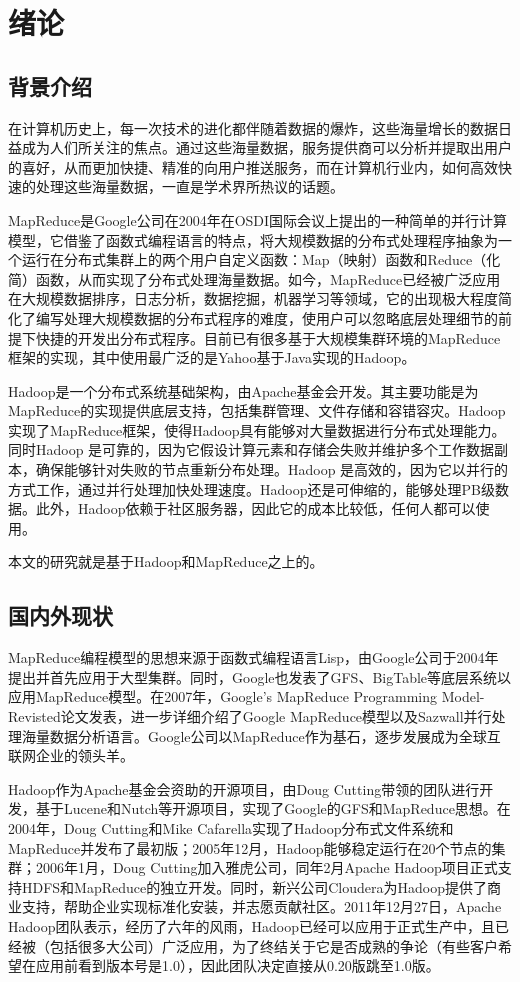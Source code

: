 \chapter{绪论}
\label{chap:1}

\section{背景介绍}

在计算机历史上，每一次技术的进化都伴随着数据的爆炸，这些海量增长的数据日益成为人们所关注的焦点。通过这些海量数据，服务提供商可以分析并提取出用户的喜好，从而更加快捷、精准的向用户推送服务，而在计算机行业内，如何高效快速的处理这些海量数据，一直是学术界所热议的话题。

MapReduce是Google公司在2004年在OSDI国际会议上提出的一种简单的并行计算模型\cite{paper:Google-MapReduce}，它借鉴了函数式编程语言的特点，将大规模数据的分布式处理程序抽象为一个运行在分布式集群上的两个用户自定义函数：Map（映射）函数和Reduce（化简）函数，从而实现了分布式处理海量数据。如今，MapReduce已经被广泛应用在大规模数据排序，日志分析，数据挖掘，机器学习等领域，它的出现极大程度简化了编写处理大规模数据的分布式程序的难度，使用户可以忽略底层处理细节的前提下快捷的开发出分布式程序。目前已有很多基于大规模集群环境的MapReduce框架的实现，其中使用最广泛的是Yahoo基于Java实现的Hadoop。

Hadoop是一个分布式系统基础架构\cite{site:Hadoop}，由Apache基金会开发。其主要功能是为MapReduce的实现提供底层支持，包括集群管理、文件存储和容错容灾。Hadoop 实现了MapReduce框架，使得Hadoop具有能够对大量数据进行分布式处理能力。同时Hadoop 是可靠的，因为它假设计算元素和存储会失败并维护多个工作数据副本，确保能够针对失败的节点重新分布处理。Hadoop 是高效的，因为它以并行的方式工作，通过并行处理加快处理速度。Hadoop还是可伸缩的，能够处理PB级数据。此外，Hadoop依赖于社区服务器，因此它的成本比较低，任何人都可以使用。

本文的研究就是基于Hadoop和MapReduce之上的。

\section{国内外现状}
MapReduce编程模型的思想来源于函数式编程语言Lisp，由Google公司于2004年提出并首先应用于大型集群。同时，Google也发表了GFS、BigTable等底层系统以应用MapReduce模型。在2007年，Google’s MapReduce Programming Model-Revisted论文发表，进一步详细介绍了Google MapReduce模型以及Sazwall并行处理海量数据分析语言。Google公司以MapReduce作为基石，逐步发展成为全球互联网企业的领头羊。

Hadoop作为Apache基金会资助的开源项目，由Doug Cutting带领的团队进行开发，基于Lucene和Nutch等开源项目，实现了Google的GFS和MapReduce思想。在2004年，Doug Cutting和Mike Cafarella实现了Hadoop分布式文件系统和MapReduce并发布了最初版；2005年12月，Hadoop能够稳定运行在20个节点的集群；2006年1月，Doug Cutting加入雅虎公司，同年2月Apache Hadoop项目正式支持HDFS和MapReduce的独立开发。同时，新兴公司Cloudera为Hadoop提供了商业支持，帮助企业实现标准化安装，并志愿贡献社区。2011年12月27日，Apache Hadoop团队表示，经历了六年的风雨，Hadoop已经可以应用于正式生产中，且已经被（包括很多大公司）广泛应用，为了终结关于它是否成熟的争论（有些客户希望在应用前看到版本号是1.0），因此团队决定直接从0.20版跳至1.0版。

